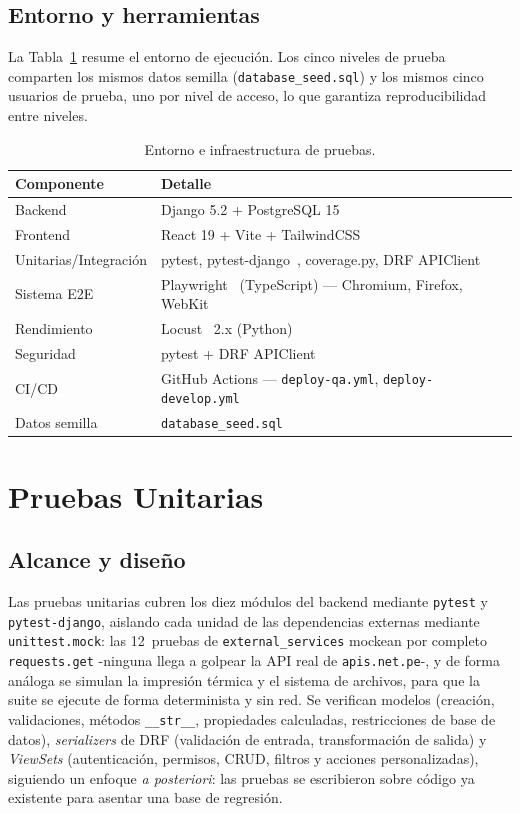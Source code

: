 \documentclass[conference]{IEEEtran}
\begin{document}
\subsection{Entorno y herramientas}

La Tabla~\ref{tab:tools} resume el entorno de ejecución. Los cinco niveles de prueba comparten los mismos datos semilla (\texttt{database\_seed.sql}) y los mismos cinco usuarios de prueba, uno por nivel de acceso, lo que garantiza reproducibilidad entre niveles.

\begin{table}[htbp]
  \caption{Entorno e infraestructura de pruebas.}
  \label{tab:tools}
  \centering
  \footnotesize
  \begin{tabular}{p{2.4cm} p{5.2cm}}
    \toprule
    \textbf{Componente} & \textbf{Detalle} \\
    \midrule
    Backend & Django 5.2 + PostgreSQL 15 \\
    Frontend & React 19 + Vite + TailwindCSS \\
    Unitarias/Integración & pytest, pytest-django~\cite{pytestdjango}, coverage.py, DRF APIClient~\cite{drf} \\
    Sistema E2E & Playwright~\cite{playwright} (TypeScript) --- Chromium, Firefox, WebKit \\
    Rendimiento & Locust~\cite{locust} 2.x (Python) \\
    Seguridad & pytest + DRF APIClient \\
    CI/CD & GitHub Actions --- \texttt{deploy-qa.yml}, \texttt{deploy-develop.yml} \\
    Datos semilla & \texttt{database\_seed.sql} \\
    \bottomrule
  \end{tabular}
\end{table}

\section{Pruebas Unitarias}
\label{sec:unit}

\subsection{Alcance y diseño}

Las pruebas unitarias cubren los diez módulos del backend mediante \texttt{pytest} y \texttt{pytest-django}, aislando cada unidad de las dependencias externas mediante \texttt{unittest.mock}: las 12~pruebas de \texttt{external\_services} mockean por completo \texttt{requests.get} -ninguna llega a golpear la API real de \texttt{apis.net.pe}-, y de forma análoga se simulan la impresión térmica y el sistema de archivos, para que la suite se ejecute de forma determinista y sin red. Se verifican modelos (creación, validaciones, métodos \texttt{\_\_str\_\_}, propiedades calculadas, restricciones de base de datos), \emph{serializers} de DRF (validación de entrada, transformación de salida) y \emph{ViewSets} (autenticación, permisos, CRUD, filtros y acciones personalizadas), siguiendo un enfoque \emph{a posteriori}: las pruebas se escribieron sobre código ya existente para asentar una base de regresión.
\end{document}
